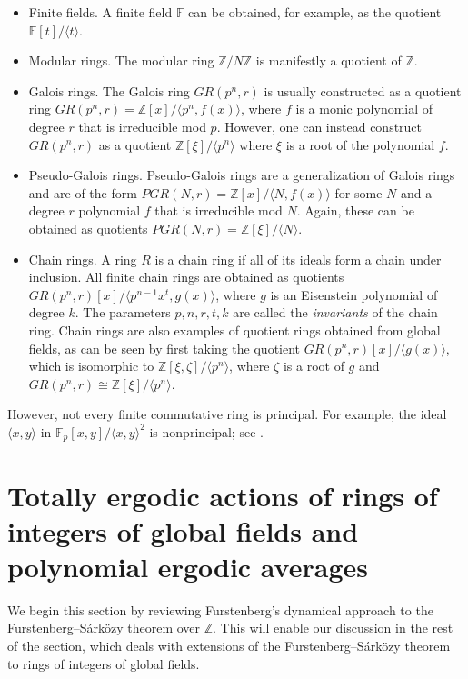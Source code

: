 \documentclass{amsart}
\theoremstyle{definition}
\numberwithin{equation}{section}
\newcommand{\Z}{\mathbb{Z}}
\newcommand{\F}{\mathbb{F}}
\begin{document}
\begin{itemize}
    \item Finite fields.
        A finite field $\F$ can be obtained, for example, as the quotient $\F[t]/\langle t \rangle$.
    \item   Modular rings.
        The modular ring $\Z/N\Z$ is manifestly a quotient of $\Z$.
    \item   Galois rings.
        The Galois ring $GR(p^n,r)$ is usually constructed as a quotient ring $GR(p^n,r) = \Z[x]/\langle p^n, f(x) \rangle$, where $f$ is a monic polynomial of degree $r$ that is irreducible mod $p$.
        However, one can instead construct $GR(p^n,r)$ as a quotient $\Z[\xi]/\langle p^n \rangle$ where $\xi$ is a root of the polynomial $f$.
    \item Pseudo-Galois rings.
        Pseudo-Galois rings are a generalization of Galois rings and are of the form $PGR(N,r) = \Z[x]/\langle N, f(x) \rangle$ for some $N$ and a degree $r$ polynomial $f$ that is irreducible mod $N$.
        Again, these can be obtained as quotients $PGR(N,r) = \Z[\xi]/\langle N \rangle$.
    \item Chain rings.
        A ring $R$ is a chain ring if all of its ideals form a chain under inclusion.
        All finite chain rings are obtained as quotients $GR(p^n,r)[x]/\langle p^{n-1}x^t, g(x)\rangle$, where $g$ is an Eisenstein polynomial of degree $k$.
        The parameters $p, n, r, t, k$ are called the \emph{invariants} of the chain ring.
        Chain rings are also examples of quotient rings obtained from global fields, as can be seen by first taking the quotient $GR(p^n,r)[x]/\langle g(x) \rangle$, which is isomorphic to $\Z[\xi,\zeta]/\langle p^n \rangle$, where $\zeta$ is a root of $g$ and $GR(p^n,r) \cong \Z[\xi]/\langle p^n \rangle$.
\end{itemize}

However, not every finite commutative ring is principal.
For example, the ideal $\langle x,y \rangle$ in $\F_p[x,y]/\langle x,y\rangle^2$ is nonprincipal; see \cite{conrad_MO, clark_MO}.


\section{Totally ergodic actions of rings of integers of global fields and polynomial ergodic averages} \label{sec:FS and TE}

We begin this section by reviewing Furstenberg's dynamical approach to the Furstenberg--S\'{a}rk\"{o}zy theorem over $\Z$.
This will enable our discussion in the rest of the section, which deals with extensions of the Furstenberg--S\'{a}rk\"{o}zy theorem to rings of integers of global fields.
\end{document}
